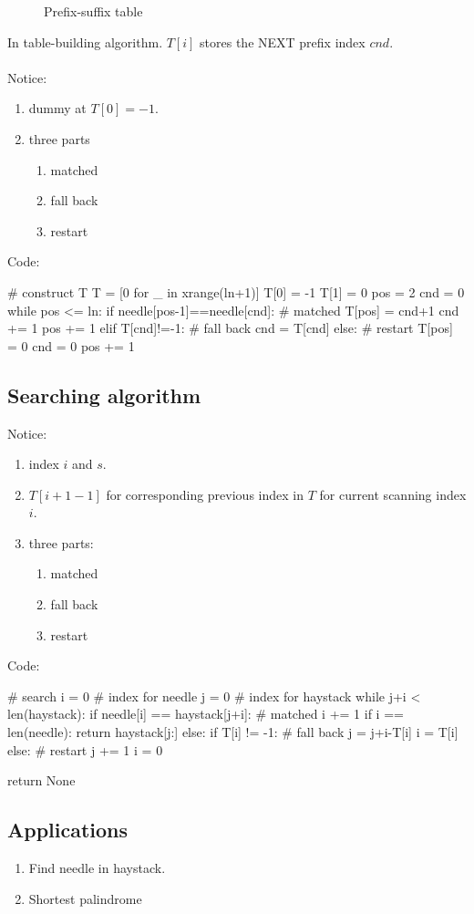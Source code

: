 \begin{figure}[hbtp]
\centering
{}
\caption{Prefix-suffix table}
\label{fig:kmp_table}
\end{figure}
In table-building algorithm. $T[i]$ stores the NEXT prefix index $cnd$.\\
\\
Notice:
\begin{enumerate}
\item dummy at $T[0]=-1$.
\item three parts
\begin{enumerate}
\item matched
\item fall back
\item restart 
\end{enumerate}
\end{enumerate}
Code:
\begin{python}
# construct T
T = [0 for _ in xrange(ln+1)]
T[0] = -1
T[1] = 0
pos = 2
cnd = 0  
while pos <= ln:
    if needle[pos-1]==needle[cnd]:  # matched
        T[pos] = cnd+1
        cnd += 1
        pos += 1
    elif T[cnd]!=-1:  # fall back 
        cnd = T[cnd]
    else:  # restart 
        T[pos] = 0
        cnd = 0
        pos += 1

\end{python}


\subsection{Searching algorithm}
Notice:
\begin{enumerate}
\item index $i$ and $s$.
\item $T[i+1-1]$ for corresponding previous index in $T$ for current scanning index $i$. 
\item three parts:
\begin{enumerate}
\item matched
\item fall back
\item restart 
\end{enumerate}
\end{enumerate}
Code: 
\begin{python}
# search
i = 0  # index for needle 
j = 0  # index for haystack
while j+i < len(haystack):
    if needle[i] == haystack[j+i]:  # matched 
        i += 1
        if i == len(needle):
            return haystack[j:]
    else:
        if T[i] != -1:  # fall back
            j = j+i-T[i]
            i = T[i]
        else:  # restart
            j += 1
            i = 0

return None
\end{python}
\subsection{Applications}
\begin{enumerate}
\item Find needle in haystack. 
\item Shortest palindrome 
\end{enumerate}

